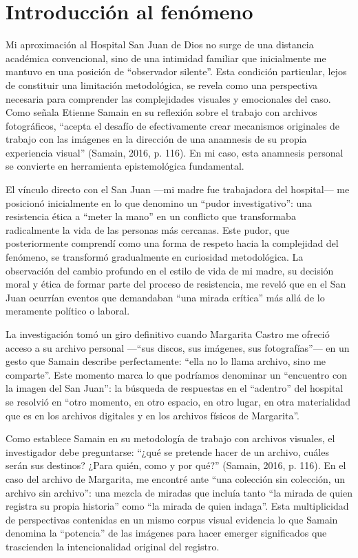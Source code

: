 \section*{Introducción al fenómeno}

\textcolor{edit30sept}{Mi aproximación al Hospital San Juan de Dios no surge de una distancia académica convencional, sino de una intimidad familiar que inicialmente me mantuvo en una posición de “observador silente”. Esta condición particular, lejos de constituir una limitación metodológica, se revela como una perspectiva necesaria para comprender las complejidades visuales y emocionales del caso. Como señala Etienne Samain en su reflexión sobre el trabajo con archivos fotográficos, “acepta el desafío de efectivamente crear mecanismos originales de trabajo con las imágenes en la dirección de una anamnesis de su propia experiencia visual” (Samain, 2016, p. 116). En mi caso, esta anamnesis personal se convierte en herramienta epistemológica fundamental.}

\textcolor{edit30sept}{El vínculo directo con el San Juan —mi madre fue trabajadora del hospital— me posicionó inicialmente en lo que denomino un “pudor investigativo”: una resistencia ética a “meter la mano” en un conflicto que transformaba radicalmente la vida de las personas más cercanas. Este pudor, que posteriormente comprendí como una forma de respeto hacia la complejidad del fenómeno, se transformó gradualmente en curiosidad metodológica. La observación del cambio profundo en el estilo de vida de mi madre, su decisión moral y ética de formar parte del proceso de resistencia, me reveló que en el San Juan ocurrían eventos que demandaban “una mirada crítica” más allá de lo meramente político o laboral.}

\textcolor{edit30sept}{La investigación tomó un giro definitivo cuando Margarita Castro me ofreció acceso a su archivo personal —“sus discos, sus imágenes, sus fotografías”— en un gesto que Samain describe perfectamente: “ella no lo llama archivo, sino me comparte”. Este momento marca lo que podríamos denominar un “encuentro con la imagen del San Juan”: la búsqueda de respuestas en el “adentro” del hospital se resolvió en “otro momento, en otro espacio, en otro lugar, en otra materialidad que es en los archivos digitales y en los archivos físicos de Margarita”.}

\textcolor{edit30sept}{Como establece Samain en su metodología de trabajo con archivos visuales, el investigador debe preguntarse: “¿qué se pretende hacer de un archivo, cuáles serán sus destinos? ¿Para quién, como y por qué?” (Samain, 2016, p. 116). En el caso del archivo de Margarita, me encontré ante “una colección sin colección, un archivo sin archivo”: una mezcla de miradas que incluía tanto “la mirada de quien registra su propia historia” como “la mirada de quien indaga”. Esta multiplicidad de perspectivas contenidas en un mismo corpus visual evidencia lo que Samain denomina la “potencia” de las imágenes para hacer emerger significados que trascienden la intencionalidad original del registro.}


